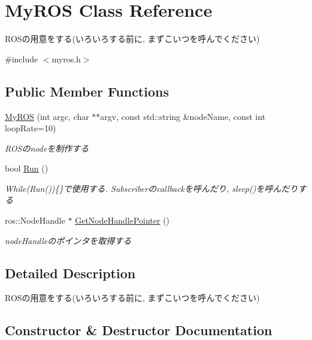 \section{My\-R\-O\-S Class Reference}
\label{classMyROS}


R\-O\-Sの用意をする(いろいろする前に, まずこいつを呼んでください)  




{\ttfamily \#include $<$myros.\-h$>$}

\subsection*{Public Member Functions}
\begin{DoxyCompactItemize}
\item 
\hyperlink{classMyROS_a91b0b89df5d4f6ac41617f31b2c9e45a}{My\-R\-O\-S} (int argc, char $\ast$$\ast$argv, const std\-::string \&node\-Name, const int loop\-Rate=10)
\begin{DoxyCompactList}\small\item\em R\-O\-Sのnodeを制作する \end{DoxyCompactList}\item 
bool \hyperlink{classMyROS_a3d02355a40459662ab08fff297dcd158}{Run} ()
\begin{DoxyCompactList}\small\item\em While(\-Run())\{\}で使用する. Subscriberのcallbackを呼んだり, sleep()を呼んだりする \end{DoxyCompactList}\item 
ros\-::\-Node\-Handle $\ast$ \hyperlink{classMyROS_ab67396c1306412fb9df816f3c3dc091e}{Get\-Node\-Handle\-Pointer} ()
\begin{DoxyCompactList}\small\item\em node\-Handleのポインタを取得する \end{DoxyCompactList}\end{DoxyCompactItemize}


\subsection{Detailed Description}
R\-O\-Sの用意をする(いろいろする前に, まずこいつを呼んでください) 

\subsection{Constructor \& Destructor Documentation}
